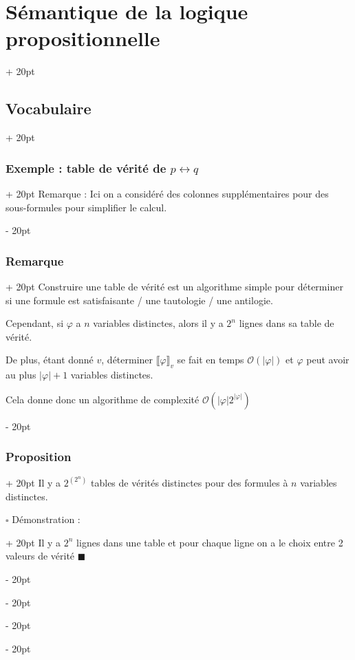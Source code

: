 \documentclass[a4paper, 12pt, twoside]{article}
\newcommand{\abs}[1]{\left\lvert #1 \right\rvert}
\newcommand{\ind}[1][20pt]{\advance\leftskip + #1}
\newcommand{\deind}[1][20pt]{\advance\leftskip - #1}
\newenvironment{indt}[2][20pt]{#2 \par \ind[#1]}{\par \deind} %
\begin{document}
\begin{indt}{\section{Sémantique de la logique propositionnelle}}
\begin{indt}{\subsection{Vocabulaire}}
\begin{indt}{\subsubsection{Exemple : table de vérité de $p \leftrightarrow q$}}
                Remarque : Ici on a considéré des colonnes supplémentaires pour des sous-formules pour simplifier le calcul.
            \end{indt}
            
            \vspace{12pt}
            
            \begin{indt}{\subsubsection{Remarque}}
                Construire une table de vérité est un algorithme simple pour déterminer si une formule est satisfaisante / une tautologie / une antilogie.
                
                Cependant, si $\varphi$ a $n$ variables distinctes, alors il y a $2^n$ lignes dans sa table de vérité.
                
                De plus, étant donné $v$, déterminer $\llbracket \varphi \rrbracket_v$ se fait en temps $\mathcal O(\abs \varphi)$ et $\varphi$ peut avoir au plus $\abs\varphi + 1$ variables distinctes.
                
                Cela donne donc un algorithme de complexité $\mathcal O(\abs\varphi 2^{\abs\varphi})$
            \end{indt}
            
            \vspace{12pt}
            
            \begin{indt}{\subsubsection{Proposition}}
                Il y a $2^{(2^n)}$ tables de vérités distinctes pour des formules à $n$ variables distinctes.
                
                \begin{indt}{$\square$ Démonstration :}
                    Il y a $2^n$ lignes dans une table et pour chaque ligne on a le choix entre 2 valeurs de vérité $\blacksquare$
                \end{indt}
            \end{indt}
        \end{indt}
        
    \end{indt}
    
    
    
\end{document}
